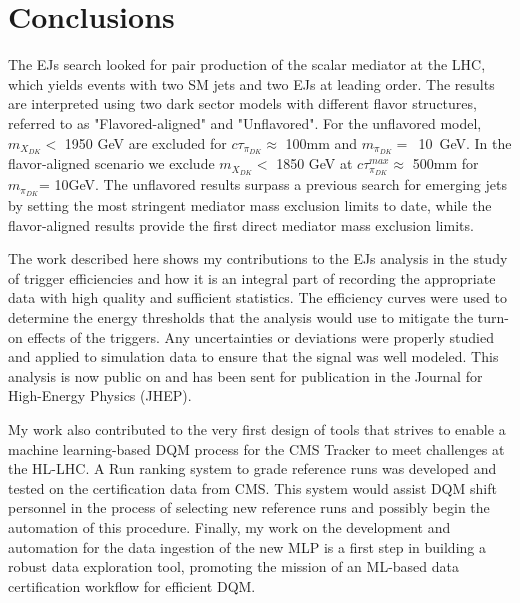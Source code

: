 \chapter{Conclusions}\label{ch:conclusion}

The EJs search looked for pair production of the scalar mediator at the LHC, which yields events with two SM jets and two EJs at leading order.
The results are interpreted using two dark sector models with different flavor structures, referred to as "Flavored-aligned" and "Unflavored".
For the unflavored model, $m_{X_{DK}} <$  1950 GeV are excluded for $c\tau_{\pi_{DK}} \approx$ 100mm and $m_{\pi_{DK}}=$~10~GeV. In the flavor-aligned scenario we exclude $m_{X_{DK}} <$  1850 GeV at $c\tau^{max}_{\pi_{DK}} \approx$ 500mm for $m_{\pi_{DK}}$= 10GeV.
The unflavored results surpass a previous search for emerging jets by setting the most stringent mediator mass exclusion limits to date, while the flavor-aligned results provide the first direct mediator mass exclusion limits.

The work described here shows my contributions to the EJs analysis in the study of trigger efficiencies and how it is an integral part of recording the appropriate data with high quality and sufficient statistics.
The efficiency curves were used to determine the energy thresholds that the analysis would use to mitigate the turn-on effects of the triggers.
Any uncertainties or deviations were properly studied and applied to simulation data to ensure that the signal was well modeled.
This analysis is now public on \cite{CMS:2024gxp} and has been sent for publication in the Journal for High-Energy Physics (JHEP).


My work also contributed to the very first design of tools that strives to enable a machine learning-based DQM process for the CMS Tracker to meet challenges at the HL-LHC.
A Run ranking system to grade reference runs was developed and tested on the certification data from CMS.
This system would assist DQM shift personnel in the process of selecting new reference runs and possibly begin the automation of this procedure.
Finally, my work on the development and automation for the data ingestion of the new MLP is a first step in building a robust data exploration tool, promoting the mission of an ML-based data certification workflow for efficient DQM.
